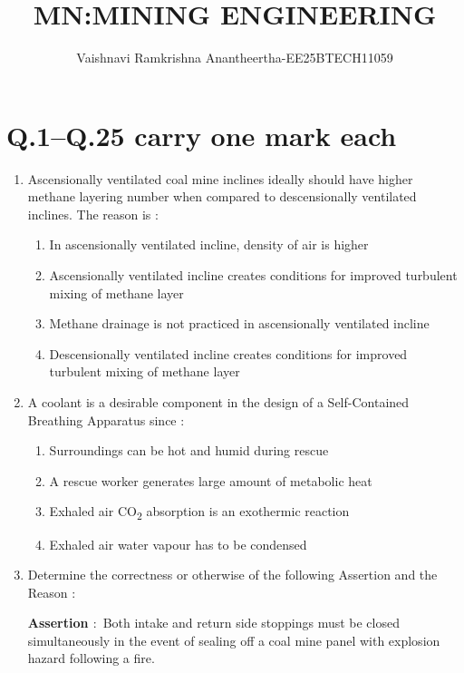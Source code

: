 \documentclass[journal,12pt,onecolumn]{IEEEtran}
\title{\Huge MN:MINING ENGINEERING}
\author{Vaishnavi Ramkrishna Anantheertha-EE25BTECH11059}
\theoremstyle{remark}
\begin{document}
\maketitle

\section*{Q.1--Q.25 carry one mark each}
\begin{enumerate}
\item Ascensionally ventilated coal mine inclines ideally should have higher methane layering number when compared to descensionally ventilated inclines. The reason is $\colon$

\hfill{}
\begin{enumerate}
\item In ascensionally ventilated incline, density of air is higher
\item Ascensionally ventilated incline creates conditions for improved turbulent mixing of methane layer
\item Methane drainage is not practiced in ascensionally ventilated incline
\item Descensionally ventilated incline creates conditions for improved turbulent mixing of methane layer
\end{enumerate}
\item A coolant is a desirable component in the design of a Self-Contained Breathing Apparatus since $\colon$

\hfill{}
\begin{multicols}{2}
\begin{enumerate}
\item Surroundings can be hot and humid during rescue
\item A rescue worker generates large amount of metabolic heat
\item Exhaled air CO\textsubscript{2} absorption is an exothermic reaction
\item Exhaled air water vapour has to be condensed
\end{enumerate}
\end{multicols}
\item  Determine the correctness or otherwise of the following Assertion  and the Reason  $\colon$
\vspace{0.5em}
\noindent

\textbf{Assertion  $\colon$} Both intake and return side stoppings must be closed simultaneously in the event of sealing off a coal mine panel with explosion hazard following a fire.


\end{enumerate}
\end{document}
